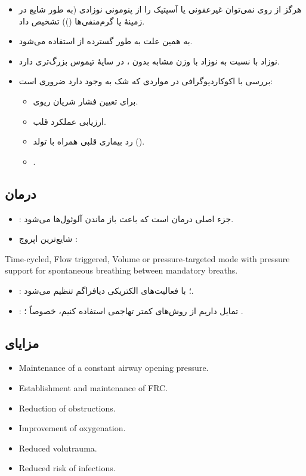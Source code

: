 \documentclass[12pt,a4paper]{article}
\begin{document}
\begin{itemize}
\item هرگز از روی  نمی‌توان  غیرعفونی یا آسپتیک را از پنومونی نوزادی (به طور شایع در زمینهٔ  یا گرم‌منفی‌ها ()) تشخیص داد.
\item به همین علت به طور گسترده از  استفاده می‌شود.
\item نوزاد با  نسبت به نوزاد با وزن مشابه بدون ، در  سایهٔ تیموس بزرگ‌تری دارد.
\item بررسی با اکوکاردیوگرافی در مواردی که شک به  وجود دارد ضروری است:
\begin{itemize}
\item برای تعیین فشار شریان ریوی.
\item ارزیابی عملکرد قلب.
\item رد بیماری قلبی همراه با تولد ().
\item {}.
\end{itemize}
\end{itemize}
\subsection*{درمان }
\begin{itemize}
\item {}: جزء اصلی درمان  است که باعث باز ماندن آلوئول‌ها می‌شود.
\item شایع‌ترین اپروچ :
\end{itemize}
\begin{latin}
Time-cycled, Flow triggered, Volume or pressure-targeted mode with pressure support for spontaneous breathing between mandatory breaths.
\end{latin}
\begin{itemize}
\item {}: ؛ با فعالیت‌های الکتریکی دیافراگم تنظیم می‌شود.
\item {}: تمایل داریم از روش‌های کمتر تهاجمی استفاده کنیم، خصوصاً ؛ .
\end{itemize}

\subsection*{مزایای }
\begin{latin}
\begin{itemize}
\item Maintenance of a constant airway opening pressure.
\item Establishment and maintenance of FRC.
\item Reduction of obstructions.
\item Improvement of oxygenation.
\item Reduced volutrauma.
\item Reduced risk of infections.
\end{itemize}
\end{latin}
\end{document}
